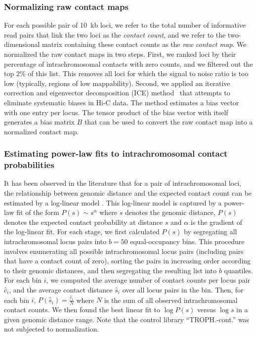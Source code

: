 \subsubsection{Normalizing raw contact maps}
\label{met:normalization}
For each possible pair of 10~kb loci, we refer to the total number of informative
read pairs that link the two loci as the {\em contact count}, and we refer to the
two-dimensional matrix containing these contact counts as the {\em raw contact map}.
We normalized the raw contact maps in two steps.  First, we ranked loci by their
percentage of intrachromosomal contacts with zero counts, and we filtered out the
top 2\% of this list. This removes all loci for which the signal to noise ratio
is too low (typically, regions of low mappability). Second, we applied an iterative
correction and eigenvector decomposition (ICE) method~\citep{imakaev:iterative}
that attempts to eliminate systematic biases in Hi-C data. The method estimates a
bias vector with one entry per locus. The tensor product of the bias vector with
itself generates a bias matrix $B$ that can be used to convert the raw contact map
into a normalized contact map.

\subsubsection{Estimating power-law fits to intrachromosomal contact probabilities}
\label{met:power-law}
It has been observed in the literature that for a pair of intrachromosomal loci,
the relationship between genomic distance and the expected contact count can be
estimated by a log-linear model \citep{lieberman-aiden:comprehensive, fudenberg:higher-order}.
This log-linear model is captured by a power-law fit of the form $P(s) \sim s^\alpha$
where $s$ denotes the genomic distance, $P(s)$ denotes the expected contact
probability at distance $s$ and $\alpha$ is the gradient of the log-linear fit.
For each stage, we first calculated $P(s)$ by segregating all intrachromosomal locus
pairs into $b=50$ equal-occupancy bins. This procedure involves enumerating all
possible intrachromosomal locus pairs (including pairs that have a contact count of zero),
sorting the pairs in increasing order according to their genomic distances, and then
segregating the resulting list into $b$ quantiles. For each bin $i$, we computed the
average number of contact counts per locus pair $\hat{c}_i$, and the average contact
distance $\hat{s}_i$ over all locus pairs in the bin. Then, for each bin $i$,
$P(\hat{s}_i)= \frac{\hat{c}_i}{N}$ where $N$ is the sum of all observed intrachromosomal
contact counts. We then found the best linear fit to $\log P(s)$ versus $\log s$ in
a given genomic distance range. Note that the control library  ``TROPH.-cont.''
was not subjected to normalization.



